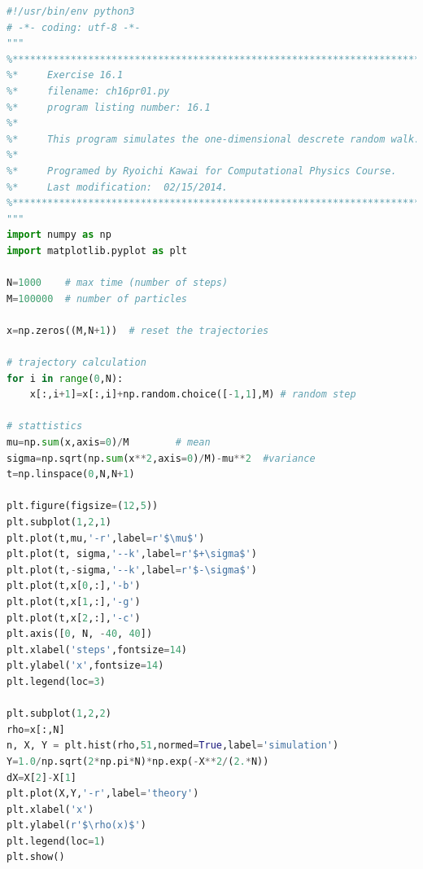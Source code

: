\bigskip
\noindent
\program
\footnotesize
\begin{lstlisting}[language=python]
#!/usr/bin/env python3
# -*- coding: utf-8 -*-
"""
%**************************************************************************
%*     Exercise 16.1                                                      *
%*     filename: ch16pr01.py                                              *
%*     program listing number: 16.1                                       *
%*                                                                        *
%*     This program simulates the one-dimensional descrete random walk.   *
%*                                                                        *
%*     Programed by Ryoichi Kawai for Computational Physics Course.       *
%*     Last modification:  02/15/2014.                                    *
%**************************************************************************
"""
import numpy as np
import matplotlib.pyplot as plt

N=1000    # max time (number of steps)
M=100000  # number of particles

x=np.zeros((M,N+1))  # reset the trajectories

# trajectory calculation
for i in range(0,N):
    x[:,i+1]=x[:,i]+np.random.choice([-1,1],M) # random step

# stattistics
mu=np.sum(x,axis=0)/M        # mean
sigma=np.sqrt(np.sum(x**2,axis=0)/M)-mu**2  #variance
t=np.linspace(0,N,N+1)

plt.figure(figsize=(12,5))
plt.subplot(1,2,1)
plt.plot(t,mu,'-r',label=r'$\mu$')
plt.plot(t, sigma,'--k',label=r'$+\sigma$')
plt.plot(t,-sigma,'--k',label=r'$-\sigma$')
plt.plot(t,x[0,:],'-b')
plt.plot(t,x[1,:],'-g')
plt.plot(t,x[2,:],'-c')
plt.axis([0, N, -40, 40])
plt.xlabel('steps',fontsize=14)
plt.ylabel('x',fontsize=14)
plt.legend(loc=3)

plt.subplot(1,2,2)
rho=x[:,N]
n, X, Y = plt.hist(rho,51,normed=True,label='simulation')
Y=1.0/np.sqrt(2*np.pi*N)*np.exp(-X**2/(2.*N))
dX=X[2]-X[1]
plt.plot(X,Y,'-r',label='theory')
plt.xlabel('x')
plt.ylabel(r'$\rho(x)$')
plt.legend(loc=1)
plt.show()
\end{lstlisting}
\normalsize


